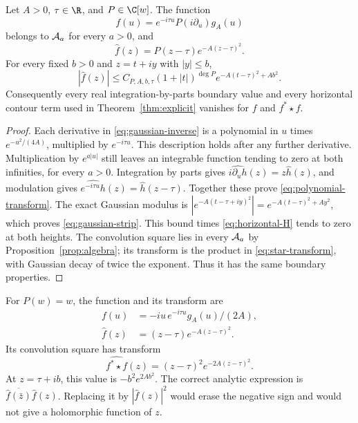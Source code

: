 \begin{proposition}
\label{prop:polynomial-gaussian}
Let $A>0$, $\tau\in\R$, and $P\in\C[w]$.  The function
\begin{equation}
 f(u)=e^{-i\tau u}P(i\partial_u)g_A(u)
 \label{eq:gaussian-inverse}
\end{equation}
belongs to $\mathcal A_a$ for every $a>0$, and
\begin{equation}
 \widehat f(z)=P(z-\tau)e^{-A(z-\tau)^2}.
 \label{eq:polynomial-transform}
\end{equation}
For every fixed $b>0$ and $z=t+iy$ with $|y|\leq b$,
\begin{equation}
 |\widehat f(z)|\leq C_{P,A,b,\tau}(1+|t|)^{\deg P}
                             e^{-A(t-\tau)^2+A b^2}.
 \label{eq:gaussian-strip}
\end{equation}
Consequently every real integration-by-parts boundary value and every
horizontal contour term used in Theorem~\ref{thm:explicit} vanishes for
$f$ and $f^*\star f$.
\end{proposition}

\begin{proof}
Each derivative in \eqref{eq:gaussian-inverse} is a polynomial in $u$ times
$e^{-u^2/(4A)}$, multiplied by $e^{-i\tau u}$.
This description holds after any further derivative.
Multiplication by $e^{a|u|}$ still leaves an integrable function tending
to zero at both infinities, for every $a>0$.
Integration by parts gives
$\widehat{i\partial_u h}(z)=z\widehat h(z)$, and modulation gives
$\widehat{e^{-i\tau u}h}(z)=\widehat h(z-\tau)$.
Together these prove \eqref{eq:polynomial-transform}.
The exact Gaussian modulus is
$|e^{-A(t-\tau+iy)^2}|=e^{-A(t-\tau)^2+Ay^2}$,
which proves \eqref{eq:gaussian-strip}.
This bound times \eqref{eq:horizontal-H} tends to zero at both heights.
The convolution square lies in every $\mathcal A_a$ by
Proposition~\ref{prop:algebra}; its transform is the product in
\eqref{eq:star-transform}, with Gaussian decay of twice the exponent.
Thus it has the same boundary properties.
\end{proof}

\begin{example}
For $P(w)=w$, the function and its transform are
\[
 \begin{aligned}
 f(u)&=-iu\,e^{-i\tau u}g_A(u)/(2A),\\
 \widehat f(z)&=(z-\tau)e^{-A(z-\tau)^2}.
 \end{aligned}
\]
Its convolution square has transform
\[
 \widehat{f^*\star f}(z)=(z-\tau)^2e^{-2A(z-\tau)^2}.
\]
At $z=\tau+ib$, this value is $-b^2e^{2Ab^2}$.
The correct analytic expression is
$\overline{\widehat f(\bar z)}\widehat f(z)$.
Replacing it by $|\widehat f(z)|^2$ would erase the negative sign and would
not give a holomorphic function of $z$.
\end{example}

